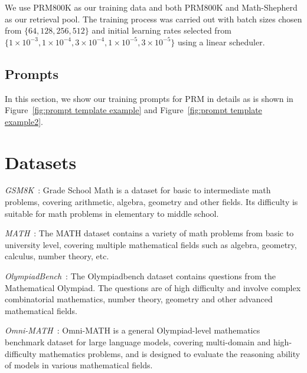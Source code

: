 We use PRM800K as our training data and both PRM800K and Math-Shepherd as our retrieval pool. The training process was carried out with batch sizes chosen from \(\{64, 128, 256, 512\}\) and initial learning rates selected from \(\{1\times 10^{-3},1\times 10^{-4}, 3 \times 10^{-4}, 1\times 10^{-5}, 3 \times 10^{-5}\}\) using a linear scheduler.

\subsection{Prompts}
\label{app:prompts}
In this section, we show our training prompts for PRM in details as is shown in Figure~\ref{fig:prompt template example} and Figure~\ref{fig:prompt template example2}.



\section{Datasets}
\label{app:datasets}

\textit{GSM8K}~\cite{gsm8k}: Grade School Math is a dataset for basic to intermediate math problems, covering arithmetic, algebra, geometry and other fields. Its difficulty is suitable for math problems in elementary to middle school.

\textit{MATH}~\cite{hendrycks2021measuring}: The MATH dataset contains a variety of math problems from basic to university level, covering multiple mathematical fields such as algebra, geometry, calculus, number theory, etc.

\textit{OlympiadBench}~\cite{he2024olympiadbenchchallengingbenchmarkpromoting}: The Olympiadbench dataset contains questions from the Mathematical Olympiad. The questions are of high difficulty and involve complex combinatorial mathematics, number theory, geometry and other advanced mathematical fields.

\textit{Omni-MATH}~\cite{gao2024omnimathuniversalolympiadlevel}: Omni-MATH is a general Olympiad-level mathematics benchmark dataset for large language models, covering multi-domain and high-difficulty mathematics problems, and is designed to evaluate the reasoning ability of models in various mathematical fields.

